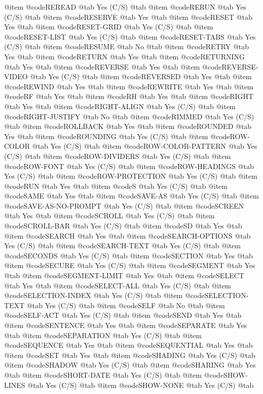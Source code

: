 @item @code{REREAD} @tab Yes (C/S) @tab
@item @code{RERUN} @tab Yes (C/S) @tab
@item @code{RESERVE} @tab Yes @tab
@item @code{RESET} @tab Yes @tab
@item @code{RESET-GRID} @tab Yes	(C/S) @tab
@item @code{RESET-LIST} @tab Yes	(C/S) @tab
@item @code{RESET-TABS} @tab Yes	(C/S) @tab
@item @code{RESUME} @tab No @tab
@item @code{RETRY} @tab Yes @tab
@item @code{RETURN} @tab Yes @tab
@item @code{RETURNING} @tab Yes @tab
@item @code{REVERSE} @tab Yes @tab
@item @code{REVERSE-VIDEO} @tab Yes	(C/S) @tab
@item @code{REVERSED} @tab Yes @tab
@item @code{REWIND} @tab Yes @tab
@item @code{REWRITE} @tab Yes @tab
@item @code{RF} @tab Yes @tab
@item @code{RH} @tab Yes @tab
@item @code{RIGHT} @tab Yes @tab
@item @code{RIGHT-ALIGN} @tab Yes	(C/S) @tab
@item @code{RIGHT-JUSTIFY} @tab No @tab
@item @code{RIMMED} @tab Yes	(C/S) @tab
@item @code{ROLLBACK} @tab Yes @tab
@item @code{ROUNDED} @tab Yes @tab
@item @code{ROUNDING} @tab Yes	(C/S) @tab
@item @code{ROW-COLOR} @tab Yes	(C/S) @tab
@item @code{ROW-COLOR-PATTERN} @tab Yes	(C/S) @tab
@item @code{ROW-DIVIDERS} @tab Yes	(C/S) @tab
@item @code{ROW-FONT} @tab Yes	(C/S) @tab
@item @code{ROW-HEADINGS} @tab Yes	(C/S) @tab
@item @code{ROW-PROTECTION} @tab Yes	(C/S) @tab
@item @code{RUN} @tab Yes @tab
@item @code{S} @tab Yes	(C/S) @tab
@item @code{SAME} @tab Yes @tab
@item @code{SAVE-AS} @tab Yes	(C/S) @tab
@item @code{SAVE-AS-NO-PROMPT} @tab Yes	(C/S) @tab
@item @code{SCREEN} @tab Yes @tab
@item @code{SCROLL} @tab Yes	(C/S) @tab
@item @code{SCROLL-BAR} @tab Yes	(C/S) @tab
@item @code{SD} @tab Yes @tab
@item @code{SEARCH} @tab Yes @tab
@item @code{SEARCH-OPTIONS} @tab Yes	(C/S) @tab
@item @code{SEARCH-TEXT} @tab Yes	(C/S) @tab
@item @code{SECONDS} @tab Yes	(C/S) @tab
@item @code{SECTION} @tab Yes @tab
@item @code{SECURE} @tab Yes	(C/S) @tab
@item @code{SEGMENT} @tab Yes @tab
@item @code{SEGMENT-LIMIT} @tab Yes @tab
@item @code{SELECT} @tab Yes @tab
@item @code{SELECT-ALL} @tab Yes	(C/S) @tab
@item @code{SELECTION-INDEX} @tab Yes	(C/S) @tab
@item @code{SELECTION-TEXT} @tab Yes	(C/S) @tab
@item @code{SELF} @tab No @tab
@item @code{SELF-ACT} @tab Yes	(C/S) @tab
@item @code{SEND} @tab Yes @tab
@item @code{SENTENCE} @tab Yes @tab
@item @code{SEPARATE} @tab Yes @tab
@item @code{SEPARATION} @tab Yes	(C/S) @tab
@item @code{SEQUENCE} @tab Yes @tab
@item @code{SEQUENTIAL} @tab Yes @tab
@item @code{SET} @tab Yes @tab
@item @code{SHADING} @tab Yes	(C/S) @tab
@item @code{SHADOW} @tab Yes	(C/S) @tab
@item @code{SHARING} @tab Yes @tab
@item @code{SHORT-DATE} @tab Yes	(C/S) @tab
@item @code{SHOW-LINES} @tab Yes	(C/S) @tab
@item @code{SHOW-NONE} @tab Yes	(C/S) @tab
